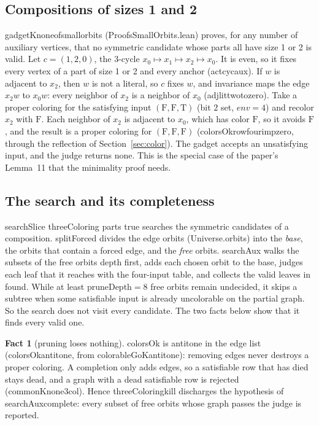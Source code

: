 \documentclass[11pt,a4paper]{article}
\newcommand{\leanus}{\textunderscore\allowbreak}
\newcommand{\lean}[1]{{\ttfamily\let\_\leanus #1}}
\newcommand{\T}{\mathrm{T}}
\newcommand{\F}{\mathrm{F}}
\theoremstyle{definition}
\newtheorem{fact}{Fact}
\begin{document}
\subsection{Compositions of sizes 1 and 2}\label{sec:small}
\lean{gadgetK\_none\_of\_small\_orbits} (\lean{ProofsSmallOrbits.lean})
proves, for any number of auxiliary vertices, that no symmetric candidate
whose parts all have size 1 or 2 is valid. Let $c=(1,2,0)$, the 3-cycle
$x_0\mapsto x_1\mapsto x_2\mapsto x_0$. It is even, so it fixes every vertex
of a part of size 1 or 2 and every anchor (\lean{act\_cyc\_aux}). If $w$ is
adjacent to $x_2$, then $w$ is not a literal, so $c$ fixes $w$, and invariance
maps the edge $x_2w$ to $x_0w$: every neighbor of $x_2$ is a neighbor of $x_0$
(\lean{adj\_lit\_two\_to\_zero}). Take a proper coloring for the satisfying
input $(\F,\F,\T)$ (bit $2$ set, $\mathit{env}=4$) and recolor $x_2$ with
$\F$. Each neighbor of $x_2$ is adjacent to $x_0$, which has color $\F$, so
it avoids $\F$, and the result is a proper coloring for $(\F,\F,\F)$
(\lean{colorsOk\_row\_four\_imp\_zero}, through the reflection of
Section~\ref{sec:color}). The gadget accepts an unsatisfying input, and the
judge returns \lean{none}. This is the special case of the paper's Lemma~11
that the minimality proof needs.

\subsection{The search and its completeness}\label{sec:search}
\lean{searchSlice threeColoring parts true} searches the symmetric
candidates of a composition. \lean{splitForced} divides the edge orbits
(\lean{Universe.orbits}) into the \emph{base}, the orbits that contain a
forced edge, and the \emph{free} orbits. \lean{searchAux} walks the subsets
of the free orbits depth first, adds each chosen orbit to the base, judges
each leaf that it reaches with the four-input table, and collects the valid
leaves in \lean{found}. While at least \lean{pruneDepth}${}=8$ free orbits
remain undecided, it skips a subtree when some satisfiable input is already
uncolorable on the partial graph. So the search does not visit every
candidate. The two facts below show that it finds every valid one.

\begin{fact}[pruning loses nothing]
\lean{colorsOk} is antitone in the edge list (\lean{colorsOk\_antitone},
from \lean{colorableGoK\_antitone}): removing edges never destroys a proper
coloring. A completion only adds edges, so a satisfiable row that has died
stays dead, and a graph with a dead satisfiable row is rejected
(\lean{commonK\_none\_3col}). Hence \lean{threeColoring\_kill} discharges the
hypothesis of \lean{searchAux\_complete}: every subset of free orbits whose
graph passes the judge is reported.
\end{fact}
\end{document}

